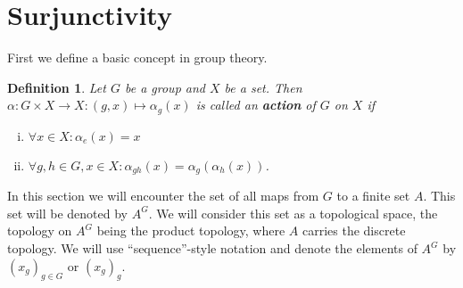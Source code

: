 \documentclass[titlepage, a4paper]{article}
\newcommand{\Z}{\mathbb{Z}}
\DeclareMathOperator{\sym}{Sym}
\newtheorem{definition}[theorem]{Definition}
\theoremstyle{remark}
\begin{document}


 

    \section{Surjunctivity}\label{sec:surjunctivity}

    First we define a basic concept in group theory.

    \begin{definition} %
	    Let $G$ be a group and $X$ be a set. Then $\alpha: G \times X \to X: (g,x) \mapsto \alpha_g(x)$ is called an \textbf{action} of $G$ on $X$ if
        \begin{enumerate}[(i)]
            \item $\forall x \in X: \alpha_e(x) = x$
            \item $\forall g,h \in G, x\in X: \alpha_{gh}(x) = \alpha_g(\alpha_h(x))$.
        \end{enumerate}
    \end{definition}

    In this section we will encounter the set of all maps from $G$ to a finite set $A$. This set will be denoted by $A^G$. We will consider this set as a topological space, the topology on $A^G$ being the product topology, where $A$ carries the discrete topology. We will use ``sequence''-style notation and denote the elements of $A^G$ by $(x_g)_{g \in G}$ or $(x_g)_g$.
\end{document}
